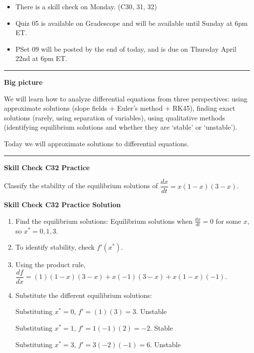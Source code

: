 \documentclass[12pt,letterpaper,noanswers]{exam}
\begin{document}
 \pdfpageheight 11in 
  \pdfpagewidth 8.5in





\begin{itemize}
\itemsep0em
\item There is a skill check on Monday. (C30, 31, 32)
\item Quiz 05 is available on Gradescope and will be available until Sunday at 6pm ET.
\item PSet 09 will be posted by the end of today, and is due on Thursday April 22nd at 6pm ET.
\end{itemize}

\hrule
\vspace{0.2cm}


\noindent\textbf{Big picture}

We will learn how to analyze differential equations from three perspectives: using approximate solutions (slope fields + Euler's method + RK45), finding exact solutions (rarely, using separation of variables), using qualitative methods (identifying equilibrium solutions and whether they are `stable' or `unstable').

Today we will approximate solutions to differential equations.

\vspace{0.2cm}
\hrule
\vspace{0.2cm}

\noindent\textbf{Skill Check C32 Practice}

\begin{questions}
\item Classify the stability of the equilibrium solutions of $\dfrac{dx}{dt} = x(1-x)(3-x)$.
\end{questions}

\noindent\textbf{Skill Check C32 Practice Solution}

\begin{enumerate}
    \item Find the equilibrium solutions: Equilibrium solutions when $\frac{dx}{dt} = 0$ for some $x$, so $x^* = 0, 1, 3$.
    \item To identify stability, check $f'(x^*)$.
    \item Using the product rule,
$\dfrac{df}{dx} = (1)(1-x)(3-x) + x(-1)(3-x) + x(1-x)(-1)$.
\item Substitute the different equilibrium solutions: 

Substituting $x^* = 0$, $f' = (1)(3) = 3$.  Unstable

Substituting $x^* = 1$, $f' = 1(-1)(2) = -2$.  Stable

Substituting $x^* = 3$, $f' = 3(-2)(-1) = 6$.  Unstable
\end{enumerate}
\end{document}
